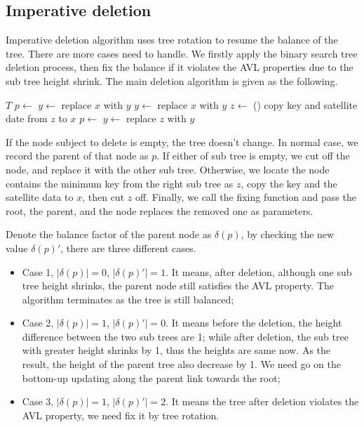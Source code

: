 \documentclass{article}
\begin{document}
\subsection{Imperative deletion}

Imperative deletion algorithm uses tree rotation to resume the balance of the tree.
There are more cases need to handle. We firstly apply the binary search tree deletion
process, then fix the balance if it violates the AVL properties due to the sub tree
height shrink. The main deletion algorithm is given as the following.

\begin{algorithmic}[1]
    \State \Return $T$
  \EndIf
  \State $p \gets$ 
    \State $y \gets $ 
    \State replace $x$ with $y$
    \State $y \gets $ 
    \State replace $x$ with $y$
  \Else
    \State $z \gets$ ()
    \State copy key and satellite date from $z$ to $x$
    \State $p \gets$ 
    \State $y \gets$ 
    \State replace $z$ with $y$
  \EndIf
  \State \Return {}
\EndFunction
\end{algorithmic}

If the node subject to delete is empty, the tree doesn't change. In normal case,
we record the parent of that node as $p$. If either of sub tree is empty, we
cut off the node, and replace it with the other sub tree. Otherwise, we locate
the node contains the minimum key from the right sub tree as $z$, copy the key and the
satellite data to $x$, then cut $z$ off. Finally, we call the fixing function
and pass the root, the parent, and the node replaces the removed one as parameters.

Denote the balance factor of the parent node as $\delta(p)$, by checking the new value
$\delta(p)'$, there are three different cases.

\begin{itemize}
\item Case 1, $|\delta(p)| = 0$, $|\delta(p)'| = 1$. It means, after deletion,
although one sub tree height shrinks, the parent node still satisfies the AVL
property. The algorithm terminates as the tree is still balanced;
\item Case 2, $|\delta(p)| = 1$, $|\delta(p)'| = 0$. It means before the deletion,
the height difference between the two sub trees are 1; while after deletion, the
sub tree with greater height shrinks by 1, thus the heights are same now. As the
result, the height of the parent tree also decrease by 1. We need go on the
bottom-up updating along the parent link towards the root;
\item Case 3, $|\delta(p)| = 1$, $|\delta(p)'| = 2$. It means the tree after deletion
violates the AVL property, we need fix it by tree rotation.
\end{itemize}
\end{document}
